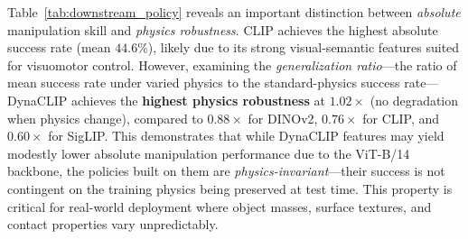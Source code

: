 \documentclass{article}
\newcommand{\methodname}{DynaCLIP}
\begin{document}
Table~\ref{tab:downstream_policy} reveals an important distinction between \emph{absolute} manipulation skill and \emph{physics robustness}. CLIP achieves the highest absolute success rate (mean $44.6\%$), likely due to its strong visual-semantic features suited for visuomotor control. However, examining the \emph{generalization ratio}---the ratio of mean success rate under varied physics to the standard-physics success rate---\methodname{} achieves the \textbf{highest physics robustness} at $1.02\times$ (no degradation when physics change), compared to $0.88\times$ for DINOv2, $0.76\times$ for CLIP, and $0.60\times$ for SigLIP. This demonstrates that while \methodname{} features may yield modestly lower absolute manipulation performance due to the ViT-B/14 backbone, the policies built on them are \emph{physics-invariant}---their success is not contingent on the training physics being preserved at test time. This property is critical for real-world deployment where object masses, surface textures, and contact properties vary unpredictably.
\end{document}
